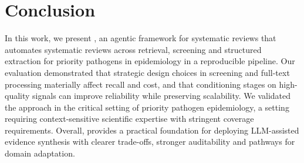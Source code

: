 \section{Conclusion}
In this work, we present \name{}, an agentic framework for systematic reviews that automates  systematic reviews across retrieval, screening and structured extraction for priority pathogens in epidemiology in a reproducible pipeline. Our evaluation demonstrated that strategic  design choices in screening and full-text processing materially affect recall and cost, and that conditioning stages on high-quality signals can improve reliability while preserving scalability. 
We validated the approach in the critical setting of priority pathogen epidemiology, a setting requiring context-sensitive scientific expertise with stringent coverage requirements. Overall, \name{} provides a practical foundation for deploying LLM-assisted evidence synthesis with clearer trade-offs, stronger auditability and pathways for domain adaptation.
